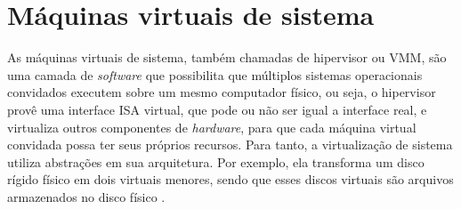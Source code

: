 
\section{Máquinas virtuais de sistema}
\label{section:virtsistema}

As máquinas virtuais de sistema, também chamadas de hipervisor ou \ac{VMM}, são uma camada de \textit{software} que possibilita
que múltiplos sistemas operacionais convidados executem sobre um mesmo computador físico, ou seja, o hipervisor provê uma interface
\ac{ISA} virtual, que pode ou não ser igual a interface real, e virtualiza outros componentes de \textit{hardware}, para que cada máquina
virtual convidada possa ter seus próprios recursos. Para tanto, a virtualização de sistema utiliza abstrações em sua arquitetura. 
Por exemplo, ela transforma um disco rígido físico em dois virtuais menores, sendo que esses discos virtuais são arquivos armazenados no 
disco físico \cite{smithenair2005}. 

